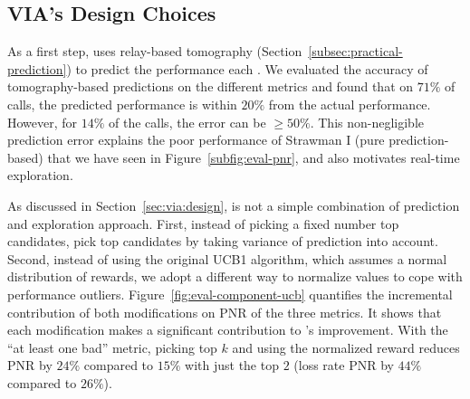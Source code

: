 
\subsection{VIA's Design Choices}
\label{subsec:design}

As a first step, \hybrid uses relay-based tomography (Section~\ref{subsec:practical-prediction}) to predict the performance each \option.
We evaluated the accuracy of tomography-based predictions on the different metrics and found that on $71\%$ of calls, the predicted performance is within $20\%$ from the actual performance. However, for $14\%$ of the calls, the error can be $\geq 50\%$. This non-negligible prediction error explains the poor performance of Strawman I (pure prediction-based) that we have seen in Figure~\ref{subfig:eval-pnr}, and also motivates real-time exploration.





As discussed in Section~\ref{sec:via:design}, \hybrid is not a simple combination of prediction and exploration approach. 
First, instead of picking a fixed number top candidates, \hybrid pick top candidates by taking variance of prediction into account. 
Second, instead of using the original UCB1 algorithm, which assumes a normal distribution of rewards, we adopt a different way to normalize values to cope with performance outliers.
Figure~\ref{fig:eval-component-ucb} quantifies the incremental contribution of both modifications on PNR of the three metrics.
It shows that each modification makes a significant contribution to \hybrid's improvement. With the ``at least one bad'' metric, picking top $k$ and using the normalized reward reduces PNR by $24\%$ compared to $15\%$ with just the top $2$ (loss rate PNR by $44\%$ compared to $26\%$).




